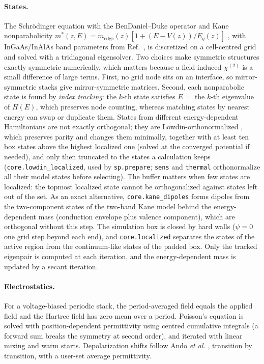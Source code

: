 \documentclass[11pt]{article}
\newcommand{\chitwo}{\chi^{(2)}}
\newcommand{\code}[1]{\texttt{#1}}
\begin{document}
\paragraph{States.} The Schr\"odinger equation with the BenDaniel--Duke operator \cite{BenDaniel1966} and Kane nonparabolicity $m^*(z,E)=m_\mathrm{edge}(z)[1+(E-V(z))/E_g(z)]$ \cite{Nelson1987}, with InGaAs/InAlAs band parameters from Ref.~\cite{Vurgaftman2001}, is discretized on a cell-centred grid and solved with a tridiagonal eigensolver. Two choices make symmetric structures exactly symmetric numerically, which matters because a field-induced $\chitwo$ is a small difference of large terms. First, no grid node sits on an interface, so mirror-symmetric stacks give mirror-symmetric matrices. Second, each nonparabolic state is found by \emph{index tracking}: the $k$-th state satisfies $E=$ the $k$-th eigenvalue of $H(E)$, which preserves node counting, whereas matching states by nearest energy can swap or duplicate them. States from different energy-dependent Hamiltonians are not exactly orthogonal; they are L\"owdin-orthonormalized \cite{Lowdin1950}, which preserves parity and changes them minimally, together with at least ten box states above the highest localized one (solved at the converged potential if needed), and only then truncated to the states a calculation keeps (\code{core.lowdin\_localized}, used by \code{sp.prepare}; \code{sens} and \code{thermal} orthonormalize all their model states before selecting). The buffer matters when few states are localized: the topmost localized state cannot be orthogonalized against states left out of the set. As an exact alternative, \code{core.kane\_dipoles} forms dipoles from the two-component states of the two-band Kane model behind the energy-dependent mass (conduction envelope plus valence component), which are orthogonal without this step. The simulation box is closed by hard walls ($\psi=0$ one grid step beyond each end), and \code{core.localized} separates the states of the active region from the continuum-like states of the padded box. Only the tracked eigenpair is computed at each iteration, and the energy-dependent mass is updated by a secant iteration.

\paragraph{Electrostatics.} For a voltage-biased periodic stack, the period-averaged field equals the applied field and the Hartree field has zero mean over a period. Poisson's equation is solved with position-dependent permittivity using centred cumulative integrals (a forward sum breaks the symmetry at second order), and iterated with linear mixing and warm starts. Depolarization shifts follow Ando \emph{et al.} \cite{Ando1982}, transition by transition, with a user-set average permittivity.
\end{document}
